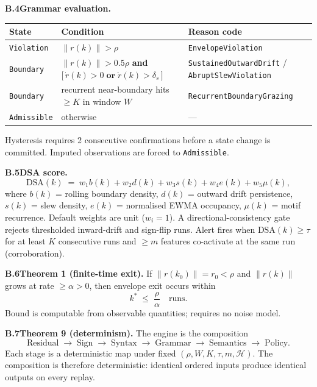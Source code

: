 \documentclass[11pt,letterpaper]{article}
\theoremstyle{scresult}
\begin{document}
\medskip
\noindent\textbf{B.4\quad Grammar evaluation.}

\vspace{2pt}
\begin{center}
\tiny\renewcommand{\arraystretch}{1.25}
\begin{tabular}{@{}lll@{}}
\toprule
\textbf{State} & \textbf{Condition} & \textbf{Reason code} \\
\midrule
\texttt{Violation}
  & $\|r(k)\| > \rho$
  & \texttt{EnvelopeViolation} \\
\texttt{Boundary}
  & $\|r(k)\| > 0.5\rho$ \;\textbf{and}\;
    $\bigl[\,\dot{r}(k)>0\;\textbf{or}\;\ddot{r}(k)>\delta_s\,\bigr]$
  & \texttt{SustainedOutwardDrift} / \texttt{AbruptSlewViolation} \\
\texttt{Boundary}
  & recurrent near-boundary hits $\geq K$ in window $W$
  & \texttt{RecurrentBoundaryGrazing} \\
\texttt{Admissible}
  & otherwise
  & --- \\
\bottomrule
\end{tabular}
\end{center}
Hysteresis requires 2 consecutive confirmations before a state change is
committed.  Imputed observations are forced to \texttt{Admissible}.

\medskip
\noindent\textbf{B.5\quad DSA score.}
\[
  \text{DSA}(k) \;=\; w_1 b(k) + w_2 d(k) + w_3 s(k)
                        + w_4 e(k) + w_5 \mu(k),
\]
where $b(k)$ = rolling boundary density, $d(k)$ = outward drift persistence,
$s(k)$ = slew density, $e(k)$ = normalised EWMA occupancy, $\mu(k)$ = motif
recurrence.  Default weights are unit ($w_i=1$).  A directional-consistency
gate rejects thresholded inward-drift and sign-flip runs.
Alert fires when $\text{DSA}(k) \geq \tau$ for at least $K$ consecutive runs
and $\geq m$ features co-activate at the same run (corroboration).

\medskip
\noindent\textbf{B.6\quad Theorem 1 (finite-time exit).}
If $\|r(k_0)\| = r_0 < \rho$ and $\|r(k)\|$ grows at rate $\geq\alpha>0$,
then envelope exit occurs within
\[
  k^* \;\leq\; \frac{\rho}{\alpha} \quad\text{runs.}
\]
Bound is computable from observable quantities; requires no noise model.

\medskip
\noindent\textbf{B.7\quad Theorem 9 (determinism).}
The engine is the composition
\[
  \text{Residual} \;\to\; \text{Sign} \;\to\; \text{Syntax}
  \;\to\; \text{Grammar} \;\to\; \text{Semantics} \;\to\; \text{Policy}.
\]
Each stage is a deterministic map under fixed $(\rho, W, K, \tau, m,
\mathcal{H})$.  The composition is therefore deterministic: identical ordered
inputs produce identical outputs on every replay.
\end{document}
